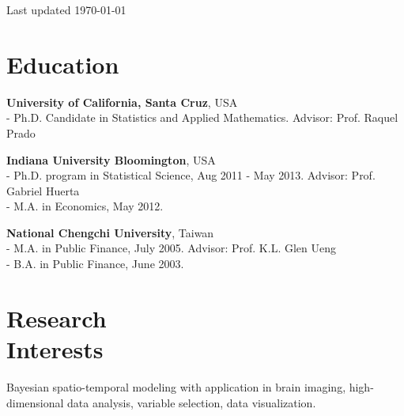 \documentclass[]{res}
\begin{document}
 
\raggedleft Last updated \today
\address{Jack Baskin School of Engineering \\ 1156 High Street \\ Santa Cruz, CA 95064 USA}
\address{Phone: 812-361-9976 \\ Email: \href{mailto:cheyu@soe.ucsc.edu}{cheyu@soe.ucsc.edu}\\Web: \url{http://chenghanyu.github.io}}
 
\begin{resume}
\raggedright

\section{Education}
\textbf{University of California, Santa Cruz}, USA\\ 
- Ph.D. Candidate in Statistics and Applied Mathematics. Advisor: Prof. Raquel Prado

 
\textbf{Indiana University Bloomington}, USA\\
- Ph.D. program in Statistical Science, Aug 2011 - May 2013. Advisor: Prof. Gabriel Huerta\\
- M.A. in Economics, May 2012.
 
\textbf{National Chengchi University}, Taiwan\\
- M.A. in Public Finance, July 2005. Advisor: Prof. K.L. Glen Ueng\\
- B.A. in Public Finance, June 2003.

\section{Research\\Interests}
Bayesian spatio-temporal modeling with application in brain imaging, high-dimensional data analysis, variable selection, data visualization.
 

\end{resume}
\end{document}
